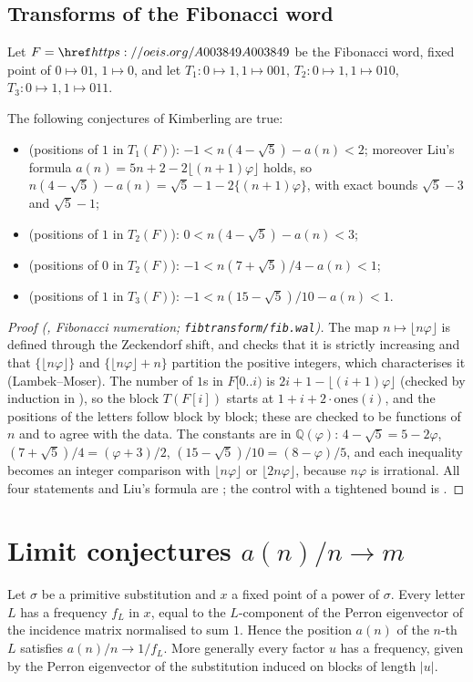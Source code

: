 \subsection{Transforms of the Fibonacci word}\label{s:fibtr}
Let $F=\oeis{A003849}$ be the Fibonacci word, fixed point of $0\mapsto01$, $1\mapsto0$, and let
$T_1:0\mapsto1,1\mapsto001$, $T_2:0\mapsto1,1\mapsto010$, $T_3:0\mapsto1,1\mapsto011$.
\begin{theorem}\label{t:fibtr} The following conjectures of Kimberling are true:
\begin{itemize}
\item {} (positions of $1$ in $T_1(F)$): $-1<n(4-\sqrt5)-a(n)<2$; moreover Liu's formula
  $a(n)=5n+2-2\lfloor(n+1)\varphi\rfloor$ holds, so $n(4-\sqrt5)-a(n)=\sqrt5-1-2\{(n+1)\varphi\}$, with exact
  bounds $\sqrt5-3$ and $\sqrt5-1$;
\item {} (positions of $1$ in $T_2(F)$): $0<n(4-\sqrt5)-a(n)<3$;
\item {} (positions of $0$ in $T_2(F)$): $-1<n(7+\sqrt5)/4-a(n)<1$;
\item {} (positions of $1$ in $T_3(F)$): $-1<n(15-\sqrt5)/10-a(n)<1$.
\end{itemize}\end{theorem}
\begin{proof}[Proof (\Walnut, Fibonacci numeration; \texttt{fibtransform/fib.wal})] The map
$n\mapsto\lfloor n\varphi\rfloor$ is defined through the Zeckendorf shift, and \Walnut{} checks that it is
strictly increasing and that $\{\lfloor n\varphi\rfloor\}$ and $\{\lfloor n\varphi\rfloor+n\}$ partition the
positive integers, which characterises it (Lambek--Moser). The number of $1$s in $F[0..i)$ is
$2i+1-\lfloor(i+1)\varphi\rfloor$ (checked by induction in \Walnut), so the block $T(F[i])$ starts at
$1+i+2\cdot\mathrm{ones}(i)$, and the positions of the letters follow block by block; these are checked to be
functions of $n$ and to agree with the data. The constants are in $\mathbb{Q}(\varphi)$:
$4-\sqrt5=5-2\varphi$, $(7+\sqrt5)/4=(\varphi+3)/2$, $(15-\sqrt5)/10=(8-\varphi)/5$, and each inequality
becomes an integer comparison with $\lfloor n\varphi\rfloor$ or $\lfloor2n\varphi\rfloor$, because
$n\varphi$ is irrational. All four statements and Liu's formula are \TRUE; the control with a tightened bound
is \FALSE. \end{proof}

\section{Limit conjectures \texorpdfstring{$a(n)/n\to m$}{a(n)/n -> m}}\label{s:limits}
\begin{lemma}\label{l:perron} Let $\sigma$ be a primitive substitution and $x$ a fixed
point of a power of $\sigma$. Every letter $L$ has a frequency $f_L$ in $x$, equal to the $L$-component of the
Perron eigenvector of the incidence matrix normalised to sum $1$. Hence the position $a(n)$ of the $n$-th
$L$ satisfies $a(n)/n\to1/f_L$. More generally every factor $u$ has a frequency, given by the Perron
eigenvector of the substitution induced on blocks of length $|u|$.\end{lemma}


